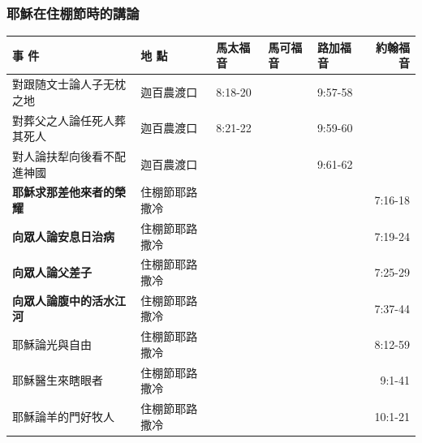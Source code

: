 \subsubsection{耶穌在住棚節時的講論}
\begin{table}[H]\centering 
\begin{tabular}{p{13.07em}|l|l|l|p{5.285em}|r}\toprule
\textbf{事 件} & \multicolumn{1}{p{7.93em}|}{\textbf{地 點}} & \multicolumn{1}{p{5.285em}|}{\textbf{馬太福音}} & \multicolumn{1}{p{5.57em}|}{\textbf{馬可福音}} & \textbf{路加福音} & \multicolumn{1}{p{4.855em}}{\textbf{約翰福音}} \\\midrule 


對跟随文士論人子无枕之地& \multicolumn{1}{p{7.93em}|}{迦百農渡口} & \multicolumn{1}{p{5.285em}|}{8:18-20} &       & 9:57-58&  \\ \midrule

對葬父之人論任死人葬其死人& \multicolumn{1}{p{7.93em}|}{迦百農渡口} & \multicolumn{1}{p{5.285em}|}{8:21-22} &       & 9:59-60&  \\ \midrule

對人論扶犁向後看不配進神國& \multicolumn{1}{p{7.93em}|}{迦百農渡口} & \multicolumn{1}{p{5.285em}|}{} &       & 9:61-62 &  \\ \midrule


\textbf{耶穌求那差他來者的榮耀} & \multicolumn{1}{p{7.93em}|}{住棚節耶路撒冷} &       &       & \multicolumn{1}{r|}{} & \multicolumn{1}{p{4.855em}}{7:16-18} \\\midrule

\textbf{向眾人論安息日治病} & \multicolumn{1}{p{7.93em}|}{住棚節耶路撒冷} &       &       & \multicolumn{1}{r|}{} & \multicolumn{1}{p{4.855em}}{7:19-24} \\\midrule
\textbf{向眾人論父差子} & \multicolumn{1}{p{7.93em}|}{住棚節耶路撒冷} &       &       & \multicolumn{1}{r|}{} & \multicolumn{1}{p{4.855em}}{7:25-29} \\\midrule
\textbf{向眾人論腹中的活水江河} & \multicolumn{1}{p{7.93em}|}{住棚節耶路撒冷} &       &       & \multicolumn{1}{r|}{} & \multicolumn{1}{p{4.855em}}{7:37-44} \\\midrule
    耶穌論光與自由 & \multicolumn{1}{p{7.93em}|}{住棚節耶路撒冷} &       &       & \multicolumn{1}{r|}{} & \multicolumn{1}{p{4.855em}}{8:12-59} \\\midrule
    耶穌醫生來瞎眼者 & \multicolumn{1}{p{7.93em}|}{住棚節耶路撒冷} &       &       & \multicolumn{1}{r|}{} & \multicolumn{1}{p{4.855em}}{9:1-41} \\ \midrule
    耶穌論羊的門好牧人 & \multicolumn{1}{p{7.93em}|}{住棚節耶路撒冷} &       &       & \multicolumn{1}{r|}{} & \multicolumn{1}{p{4.855em}}{10:1-21} \\\midrule 
\end{tabular}%
\end{table}%

